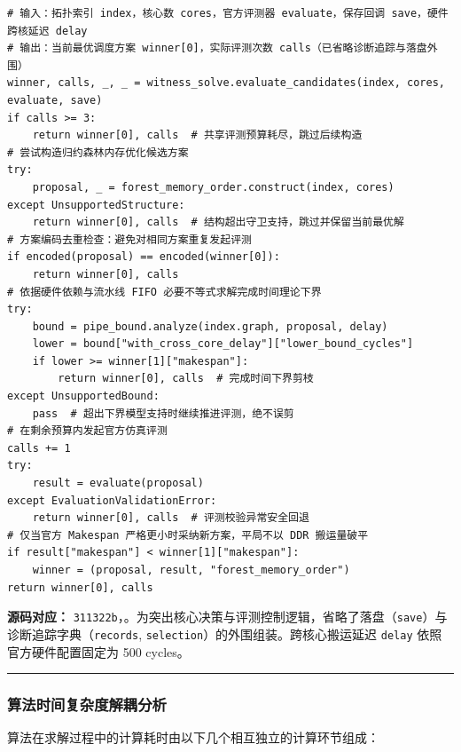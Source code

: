 \documentclass[anonymous,withtoc]{gmcm2026}
\begin{document}
\begin{lstlisting}[style=paperpseudo]
# 输入：拓扑索引 index，核心数 cores，官方评测器 evaluate，保存回调 save，硬件跨核延迟 delay
# 输出：当前最优调度方案 winner[0]，实际评测次数 calls（已省略诊断追踪与落盘外围）
winner, calls, _, _ = witness_solve.evaluate_candidates(index, cores, evaluate, save)
if calls >= 3:
    return winner[0], calls  # 共享评测预算耗尽，跳过后续构造
# 尝试构造归约森林内存优化候选方案
try:
    proposal, _ = forest_memory_order.construct(index, cores)
except UnsupportedStructure:
    return winner[0], calls  # 结构超出守卫支持，跳过并保留当前最优解
# 方案编码去重检查：避免对相同方案重复发起评测
if encoded(proposal) == encoded(winner[0]):
    return winner[0], calls
# 依据硬件依赖与流水线 FIFO 必要不等式求解完成时间理论下界
try:
    bound = pipe_bound.analyze(index.graph, proposal, delay)
    lower = bound["with_cross_core_delay"]["lower_bound_cycles"]
    if lower >= winner[1]["makespan"]:
        return winner[0], calls  # 完成时间下界剪枝
except UnsupportedBound:
    pass  # 超出下界模型支持时继续推进评测，绝不误剪
# 在剩余预算内发起官方仿真评测
calls += 1
try:
    result = evaluate(proposal)
except EvaluationValidationError:
    return winner[0], calls  # 评测校验异常安全回退
# 仅当官方 Makespan 严格更小时采纳新方案，平局不以 DDR 搬运量破平
if result["makespan"] < winner[1]["makespan"]:
    winner = (proposal, result, "forest_memory_order")
return winner[0], calls
\end{lstlisting}
\textbf{源码对应：} \texttt{311322b}，\texttt{}。为突出核心决策与评测控制逻辑，省略了落盘（\texttt{save}）与诊断追踪字典（\texttt{records}, \texttt{selection}）的外围组装。跨核心搬运延迟 \texttt{delay} 依照官方硬件配置固定为 500 cycles。

\par\hrule\endgroup

\subsubsection{算法时间复杂度解耦分析}

算法在求解过程中的计算耗时由以下几个相互独立的计算环节组成：
\end{document}
